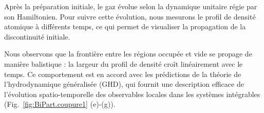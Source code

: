 
			
			




Après la préparation initiale, le gaz évolue selon la dynamique unitaire régie par son Hamiltonien. Pour suivre cette évolution, nous mesurons le profil de densité atomique à différents temps, ce qui permet de visualiser la propagation de la discontinuité initiale.

Nous observons que la frontière entre les régions occupée et vide se propage de manière balistique : la largeur du profil de densité croît linéairement avec le temps. Ce comportement est en accord avec les prédictions de la théorie de l’hydrodynamique généralisée (GHD), qui fournit une description efficace de l’évolution spatio-temporelle des observables locales dans les systèmes intégrables (Fig.~\ref{fig:BiPart.coupure1} (e)-(g)).\\

